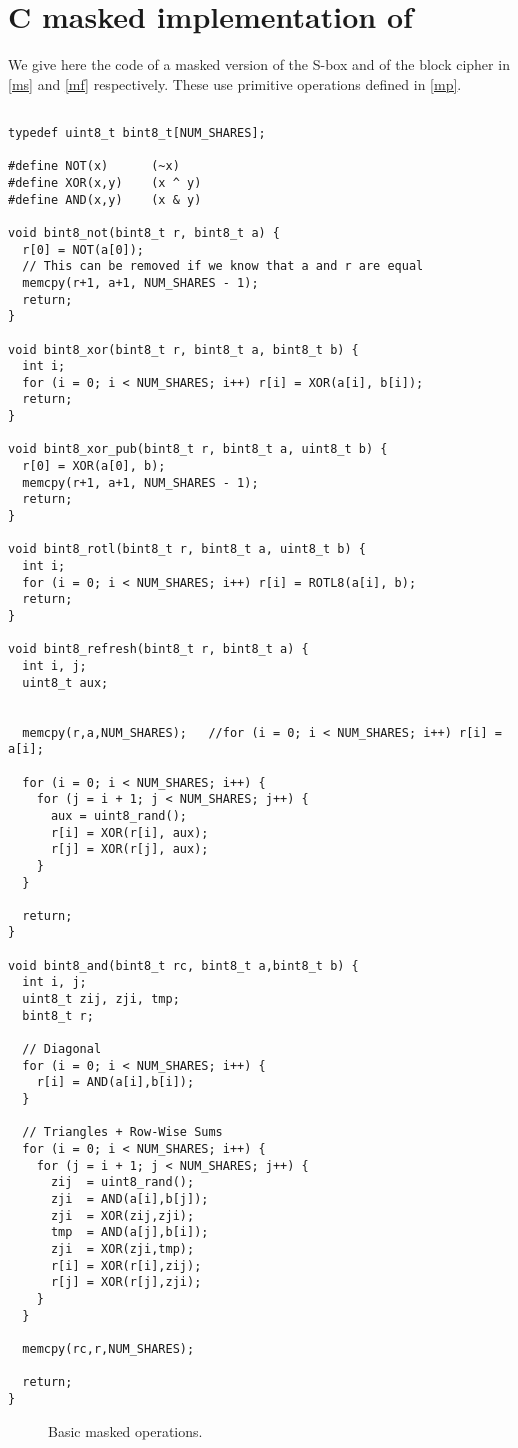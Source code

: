 \section{C masked implementation of \fly}
\label{sec:mask}

We give here the code of a masked version of the \littlunOne S-box and of the \fly block cipher in \autoref{ms} and \autoref{mf} respectively. These use primitive operations defined in \autoref{mp}.

\begin{verbatim}

typedef uint8_t bint8_t[NUM_SHARES];

#define NOT(x)      (~x)
#define XOR(x,y)    (x ^ y)
#define AND(x,y)    (x & y)

void bint8_not(bint8_t r, bint8_t a) {
  r[0] = NOT(a[0]);
  // This can be removed if we know that a and r are equal
  memcpy(r+1, a+1, NUM_SHARES - 1);
  return;
}

void bint8_xor(bint8_t r, bint8_t a, bint8_t b) {
  int i;
  for (i = 0; i < NUM_SHARES; i++) r[i] = XOR(a[i], b[i]);
  return;
}

void bint8_xor_pub(bint8_t r, bint8_t a, uint8_t b) {
  r[0] = XOR(a[0], b);
  memcpy(r+1, a+1, NUM_SHARES - 1);
  return;
}

void bint8_rotl(bint8_t r, bint8_t a, uint8_t b) {
  int i;
  for (i = 0; i < NUM_SHARES; i++) r[i] = ROTL8(a[i], b);
  return;
}

void bint8_refresh(bint8_t r, bint8_t a) {
  int i, j;
  uint8_t aux;


  memcpy(r,a,NUM_SHARES);   //for (i = 0; i < NUM_SHARES; i++) r[i] = a[i];

  for (i = 0; i < NUM_SHARES; i++) {
    for (j = i + 1; j < NUM_SHARES; j++) {
      aux = uint8_rand();
      r[i] = XOR(r[i], aux);
      r[j] = XOR(r[j], aux);
    }
  }

  return;
}

void bint8_and(bint8_t rc, bint8_t a,bint8_t b) {
  int i, j;
  uint8_t zij, zji, tmp;
  bint8_t r;

  // Diagonal
  for (i = 0; i < NUM_SHARES; i++) {
    r[i] = AND(a[i],b[i]);
  }

  // Triangles + Row-Wise Sums
  for (i = 0; i < NUM_SHARES; i++) {
    for (j = i + 1; j < NUM_SHARES; j++) {
      zij  = uint8_rand();
      zji  = AND(a[i],b[j]);
      zji  = XOR(zij,zji);
      tmp  = AND(a[j],b[i]);
      zji  = XOR(zji,tmp);
      r[i] = XOR(r[i],zij);
      r[j] = XOR(r[j],zji);
    }
  }

  memcpy(rc,r,NUM_SHARES);

  return;
}
\end{verbatim}
\begin{figure}[ht]
\caption{Basic masked operations\label{mp}.} 
\end{figure}


